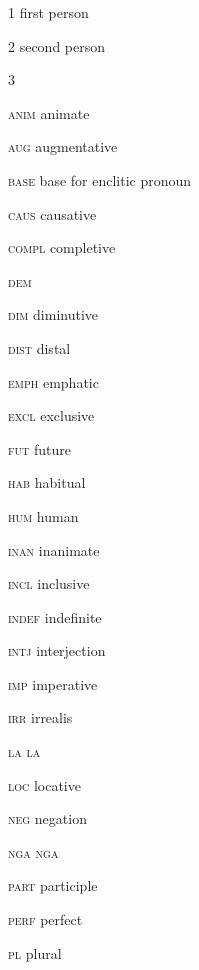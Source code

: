 
    
\begin{multicols}{2} 



\textsc{1}    \hfill        first person \

\textsc{2}      \hfill      second person \

\textsc{3}       \hfill       {} \

\textsc{anim}    \hfill        animate \

\textsc{aug} \hfill   augmentative    \

\textsc{base}  \hfill   base for enclitic pronoun \

\textsc{caus}   \hfill  causative  \

\textsc{compl}  \hfill  completive \

\textsc{dem}  \hfill  {} \

\textsc{dim} \hfill   diminutive \

\textsc{dist}  \hfill  distal \

\textsc{emph} \hfill   emphatic \

\textsc{excl} \hfill   exclusive \

\textsc{fut} \hfill  future \

\textsc{hab} \hfill  habitual \

\textsc{hum} \hfill  human \

\textsc{inan} \hfill  inanimate \

\textsc{incl} \hfill  inclusive \

\textsc{indef} \hfill  indefinite \

\textsc{intj} \hfill  interjection \

\textsc{imp} \hfill  imperative \

\textsc{irr} \hfill  irrealis \

\textsc{la} \hfill  {} \textsc{la}  \

\textsc{loc} \hfill  locative \

\textsc{neg} \hfill  negation \

\textsc{nga} \hfill  {} \textsc{nga}  \

\textsc{part} \hfill  participle \

\textsc{perf} \hfill  perfect  \

\textsc{pl} \hfill  plural \


\end{multicols}
